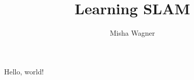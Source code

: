 \documentclass{article}
\title{Learning SLAM}
\author{Misha Wagner}
\begin{document}
\maketitle
Hello, world!
\end{document}
